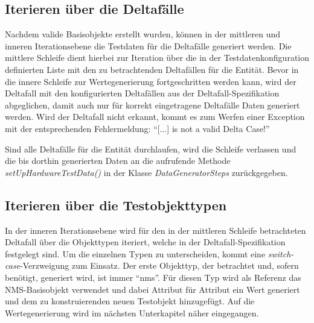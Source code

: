 \subsection{Iterieren über die Deltafälle}\label{subsec:iterationDeltacases}
Nachdem valide Basisobjekte erstellt wurden, können in der mittleren und inneren Iterationsebene die Testdaten für die Deltafälle generiert werden. Die mittlere Schleife dient hierbei zur Iteration über die in der Testdatenkonfiguration definierten Liste mit den zu betrachtenden Deltafällen für die Entität. Bevor in die innere Schleife zur Wertegenerierung fortgeschritten werden kann, wird der Deltafall mit den konfigurierten Deltafällen aus der Deltafall-Spezifikation abgeglichen, damit auch nur für korrekt eingetragene Deltafälle Daten generiert werden. Wird der Deltafall nicht erkannt, kommt es zum Werfen einer Exception mit der entsprechenden Fehlermeldung: \enquote{[...] is not a valid Delta Case!}

Sind alle Deltafälle für die Entität durchlaufen, wird die Schleife verlassen und die bis dorthin generierten Daten an die aufrufende Methode \textit{setUpHardwareTestData()} in der Klasse \textit{DataGeneratorSteps} zurückgegeben.

\subsection{Iterieren über die Testobjekttypen}\label{subsec:iterationObjectTypes}
In der inneren Iterationsebene wird für den in der mittleren Schleife betrachteten Deltafall über die Objekttypen iteriert, welche in der Deltafall-Spezifikation festgelegt sind. Um die einzelnen Typen zu unterscheiden, kommt eine \textit{switch-case}-Verzweigung zum Einsatz. Der erste Objekttyp, der betrachtet und, sofern benötigt, generiert wird, ist immer \enquote{nms}. Für diesen Typ wird als Referenz das \ac{NMS}-Basisobjekt verwendet und dabei Attribut für Attribut ein Wert generiert und dem zu konstruierenden neuen Testobjekt hinzugefügt. Auf die Wertegenerierung wird im nächsten Unterkapitel näher eingegangen.

